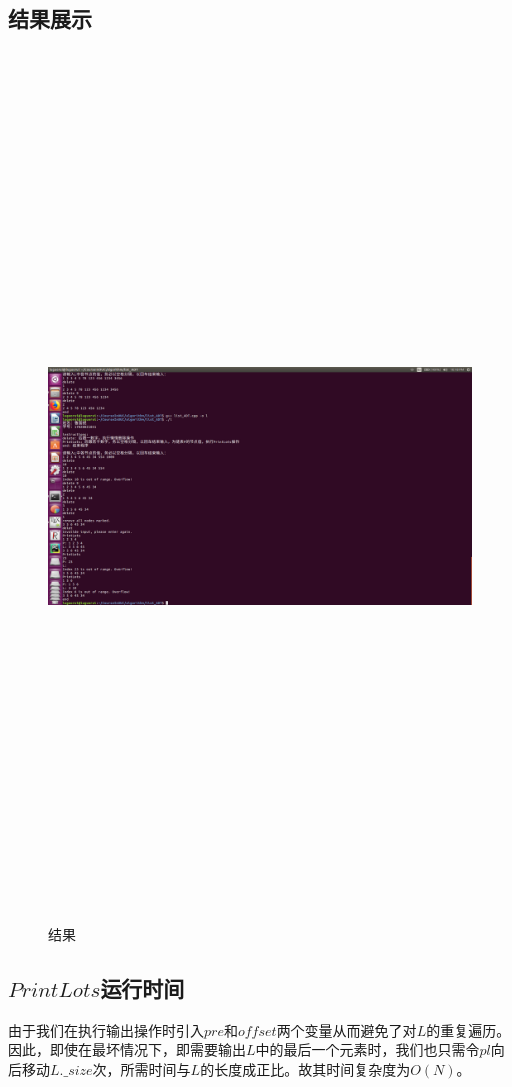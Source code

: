 \documentclass[UTF8]{ctexart}
\begin{document}
	\subsection{结果展示}
	\newpage
\begin{figure}[H]
	\centering 
	\includegraphics[width=18cm, height=23cm]{list_res.png} 
	\caption{结果} 
	\label{res}
\end{figure}


	\subsection{$PrintLots$运行时间}\label{time_of_PrintLots}
	\indent 由于我们在执行输出操作时引入$pre$和$offset$两个变量从而避免了对$L$的重复遍历。因此，即使在最坏情况下，即需要输出$L$中的最后一个元素时，我们也只需令$pl$向后移动$L.\_size$次，所需时间与$L$的长度成正比。故其时间复杂度为$O(N)$。
	
\end{document}
